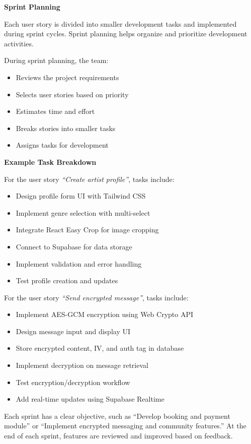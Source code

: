 \documentclass[12pt,a4paper]{report}
\begin{document}
\textbf{Sprint Planning}

Each user story is divided into smaller development tasks and implemented during sprint cycles. Sprint planning helps organize and prioritize development activities.

During sprint planning, the team:

\begin{itemize}
\item Reviews the project requirements
\item Selects user stories based on priority
\item Estimates time and effort
\item Breaks stories into smaller tasks
\item Assigns tasks for development
\end{itemize}

\textbf{Example Task Breakdown}

For the user story \textit{``Create artist profile''}, tasks include:

\begin{itemize}
\item Design profile form UI with Tailwind CSS
\item Implement genre selection with multi-select
\item Integrate React Easy Crop for image cropping
\item Connect to Supabase for data storage
\item Implement validation and error handling
\item Test profile creation and updates
\end{itemize}

For the user story \textit{``Send encrypted message''}, tasks include:

\begin{itemize}
\item Implement AES-GCM encryption using Web Crypto API
\item Design message input and display UI
\item Store encrypted content, IV, and auth tag in database
\item Implement decryption on message retrieval
\item Test encryption/decryption workflow
\item Add real-time updates using Supabase Realtime
\end{itemize}

Each sprint has a clear objective, such as ``Develop booking and payment module'' or ``Implement encrypted messaging and community features.'' At the end of each sprint, features are reviewed and improved based on feedback.
\end{document}
